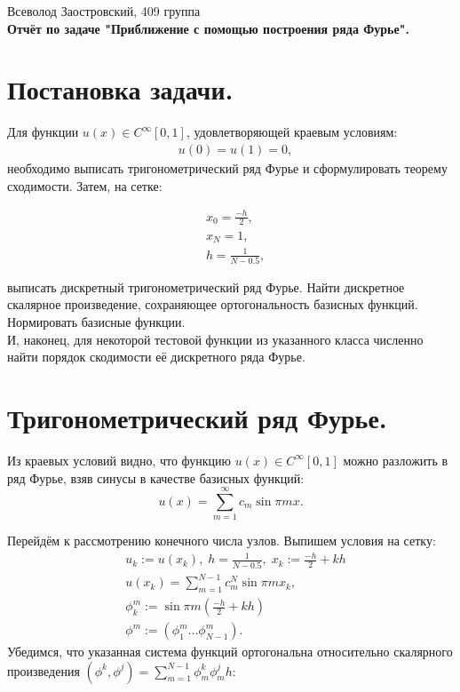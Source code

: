 \documentclass[14pt,a4paper]{extarticle}
\newcommand{\1}{\mathbbm{1}}
\begin{document}
\begin{center}

{Всеволод Заостровский, 409 группа}\\
{\bfseries Отчёт по задаче "Приближение с помощью построения ряда Фурье".\\}
\vspace{1cm}

\end{center}

\section{Постановка задачи.}
Для функции $u(x) \in C^{\infty}[0, 1]$, удовлетворяющей краевым условиям:
\begin{align*}
    & u(0) = u(1) = 0,
\end{align*}
необходимо выписать тригонометрический ряд Фурье и сформулировать теорему сходимости. Затем, на сетке:

\begin{align*}
    & x_0 = \frac{-h}{2}, \\
    & x_N = 1, \\
    & h = \frac{1}{N - 0.5},
\end{align*}     

выписать дискретный тригонометрический ряд Фурье. 
Найти дискретное скалярное произведение, сохраняющее ортогональность базисных функций. 
Нормировать базисные функции. 
\\
И, наконец, для некоторой тестовой функции из указанного класса численно найти порядок скодимости её дискретного ряда Фурье.

\section{Тригонометрический ряд Фурье.}
Из краевых условий видно, что функцию $u(x) \in C^{\infty}[0, 1]$ можно разложить в ряд Фурье, 
взяв синусы в качестве базисных функций:
\begin{equation*}
    u(x) = \sum_{m = 1}^{\infty} c_m \sin {\pi m x}.
\end{equation*}

Перейдём к рассмотрению конечного числа узлов. Выпишем условия на сетку:
\begin{align*}
    & u_k := u(x_k), \; h = \frac{1}{N - 0.5}, \; x_k := \frac{-h}{2} + k h \\
    & u(x_k) = \sum_{m=1}^{N - 1} c_m^N \sin{\pi m x_k}, \\
    & \phi_k^m := \sin{\pi m (\frac{-h}{2} + k h)} \\
    & \phi^m := (\phi_1^m ... \phi_{N-1}^m).
\end{align*} 
Убедимся, что указанная система функций ортогональна относительно скалярного произведения 
${(\phi^k, \phi^j) = \sum_{m = 1}^{N - 1}\phi_m^k \phi_m^j h}$:
\end{document}
